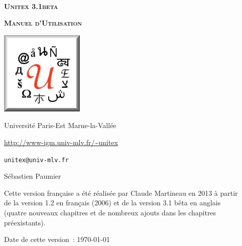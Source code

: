 
\begin{titlepage}
\begin{center}

~

\vspace{3cm}
\Huge
\textsc{\textbf{Unitex 3.1beta}}

\vspace{1cm}

\huge
\textsc{\textbf{Manuel d'Utilisation}}

\vspace{2cm}

  \begin{center}
    \includegraphics[width=4cm]{resources/img/logo-Unitex.png}
  \end{center}
\normalsize

\vspace{2cm}

\LARGE

Université Paris-Est Marne-la-Vallée
\bigskip
\normalsize

\url{http://www-igm.univ-mlv.fr/~unitex}

\verb$unitex@univ-mlv.fr$

\vspace{1cm}

Sébastien Paumier
\bigskip

Cette version française a été réalisée par Claude Martineau en 2013 à partir\\
de la version 1.2 en français (2006) et de la version 3.1 bêta en anglais \\
(quatre nouveaux chapitres et de nombreux ajouts dans les chapitres préexistants).
\bigskip

\mydate
Date de cette version~: \today

\end{center}

\end{titlepage}
